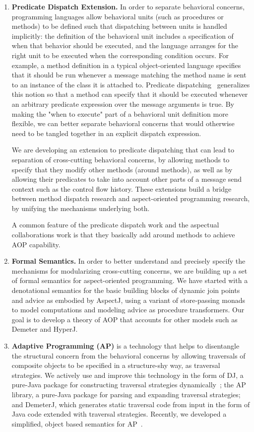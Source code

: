 \documentclass{acm_proc_article-sp}
\begin{document}
\begin{enumerate}
\item 
{\bf Predicate Dispatch Extension.}
In order to separate behavioral concerns, programming languages allow
behavioral units (such as procedures or methods) to be defined such
that dispatching between units is handled implicitly: the definition
of the behavioral unit includes a specification of when that behavior
should be executed, and the language arranges for the right unit to be
executed when the corresponding condition occurs.  For example, a
method definition in a typical object-oriented language specifies that
it should be run whenever a message matching the method name is sent
to an instance of the class it is attached to.  Predicate
dispatching~\cite{predicate-dispatch}
generalizes this notion so that a method can specify that it
should be executed whenever an arbitrary predicate expression over the
message arguments is true.  By making the "when to execute" part of a
behavioral unit definition more flexible, we can better separate
behavioral concerns that would otherwise need to be tangled together
in an explicit dispatch expression.

We are developing an extension to predicate dispatching that can lead
to separation of cross-cutting behavioral concerns, by allowing
methods to specify that they modify other methods (around methods), as
well as by allowing their predicates to take into account other parts
of a message send context such as the control flow history.  These
extensions build a bridge between method dispatch research and
aspect-oriented programming research, by unifying the mechanisms
underlying both.

A common feature of the predicate dispatch work and the aspectual
collaborations work is that they basically add around methods to
achieve AOP capability.


\item
{\bf Formal Semantics.}
In order to better understand and precisely specify the mechanisms for
modularizing cross-cutting concerns, we are building up a set of
formal semantics for aspect-oriented programming.  We have started
with a denotational semantics for the basic building blocks of dynamic
join points and advice as embodied by AspectJ, using a variant of
store-passing monads to model computations and modeling
advice as procedure transformers.  Our goal is to develop a theory of
AOP that accounts for other models such as Demeter and HyperJ.

\item
{\bf Adaptive Programming (AP)} is a technology that helps to
disentangle the structural concern from the behavioral concerns by
allowing traversals of composite objects to be specified in a
structure-shy way, as traversal strategies.  We actively use and
improve this technology in the form of DJ, a pure-Java package for
constructing traversal strategies
dynamically~\cite{OrleansLieberherrReflection01}; the AP library, a
pure-Java package for parsing and expanding traversal strategies; and
DemeterJ, which generates static traversal code from input in the form
of Java code extended with traversal strategies.  Recently, we
developed a simplified, object based semantics for
AP~\cite{mitch:karl-2000}.
\end{enumerate}
\end{document}
